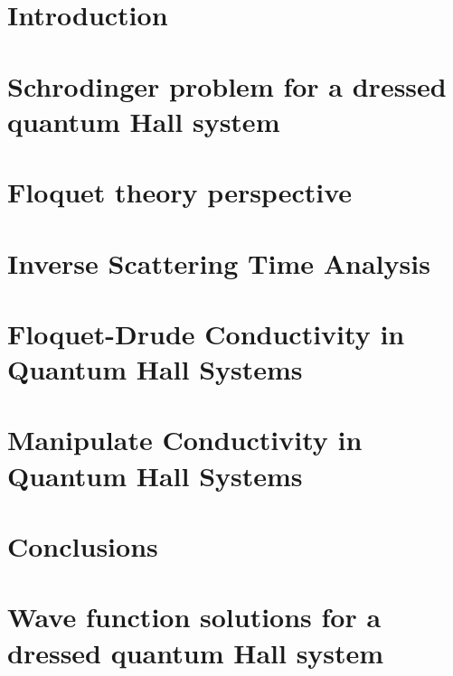 \documentclass[%
 reprint,
 amsmath,amssymb,
 aps,
prb,
]{revtex4-2}
\begin{document}
\section{\label{sec_introduction} Introduction}


\section{\label{sec_schrodinger_problem} Schrodinger problem for a dressed quantum Hall system}


\section{\label{sec_floquet_theory} Floquet theory perspective}


\section{\label{sec_inverse_scattering_time}  Inverse Scattering Time Analysis}


\section{\label{sec_floquet_drude_conductivity} Floquet-Drude Conductivity in Quantum Hall Systems}


\section{\label{sec_manipulate_conductivity} Manipulate Conductivity in Quantum Hall Systems}


\section{\label{sec_conclusions} Conclusions}


\begin{acknowledgments}

\end{acknowledgments}

\appendix

\section{\label{appendix_a} Wave function solutions for a dressed quantum Hall system}

\end{document}
